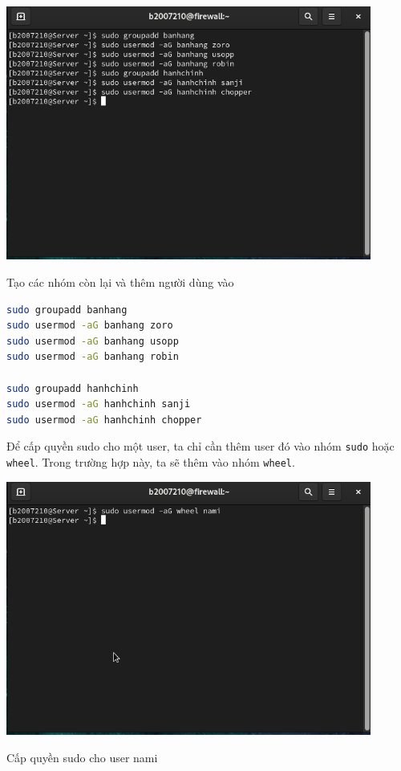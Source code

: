 \documentclass[a4paper, 11pt]{article}
\begin{document}
\begin{minipage}
    {\linewidth}
    \captionsetup{type=figure}
    \centering
    \includegraphics[width=12cm]{images/groupadd-other.png}
    \caption{Tạo các nhóm còn lại và thêm người dùng vào}
    \label{figure:groupadd-other}
\end{minipage}

\begin{lstlisting}[language=bash, caption=Tạo các nhóm còn lại và thêm người dùng vào]
sudo groupadd banhang
sudo usermod -aG banhang zoro
sudo usermod -aG banhang usopp
sudo usermod -aG banhang robin

sudo groupadd hanhchinh
sudo usermod -aG hanhchinh sanji
sudo usermod -aG hanhchinh chopper
\end{lstlisting}

Để cấp quyền sudo cho một user, ta chỉ cần thêm user đó vào nhóm \texttt{sudo} hoặc \texttt{wheel}.
Trong trường hợp này, ta sẽ thêm vào nhóm \texttt{wheel}.

\begin{minipage}
    {\linewidth}
    \captionsetup{type=figure}
    \centering
    \includegraphics[width=12cm]{images/wheel-nami.png}
    \caption{Cấp quyền sudo cho user nami}
    \label{figure:wheel-nami}
\end{minipage}
\end{document}
